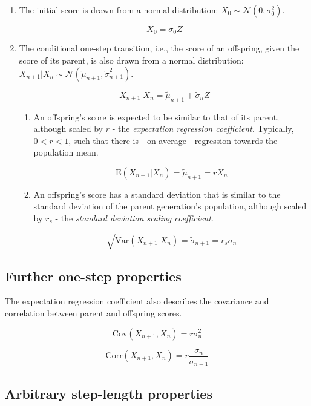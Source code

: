 \documentclass[a4paper,11pt]{article}
\begin{document}
\begin{enumerate}

\item The initial score is drawn from a normal distribution: $X_0 \sim \mathcal{N}(0, \sigma_0^2)$.

$$X_0 = \sigma_0 Z$$

\item The conditional one-step transition, i.e., the score of an offspring, given the score of its parent, is also drawn from a normal distribution: $X_{n+1}|X_n \sim \mathcal{N}(\tilde{\mu}_{n+1}, \tilde{\sigma}_{n+1}^2)$.

$$X_{n+1}|X_n = \tilde{\mu}_{n+1} + \tilde{\sigma}_n Z$$

\begin{enumerate}

\item An offspring's score is expected to be similar to that of its parent, although scaled by $r$ - the \emph{expectation regression coefficient}. Typically, $0 < r < 1$, such that there is - on average - regression towards the population mean.

$$\mathrm{E}(X_{n+1}|X_n) = \tilde{\mu}_{n+1} = rX_n$$

\item An offspring's score has a standard deviation that is similar to the standard deviation of the parent generation's population, although scaled by  $r_s$ - the \emph{standard deviation scaling coefficient}.

$$\sqrt{\mathrm{Var}(X_{n+1}|X_n)} =\tilde{\sigma}_{n+1} = r_s \sigma_n$$

\end{enumerate}
\end{enumerate}


\subsection{Further one-step properties}

The expectation regression coefficient also describes the covariance and correlation between parent and offspring scores. 

$$\mathrm{Cov}(X_{n+1}, X_n) = r \sigma_n^2$$

$$\mathrm{Corr}(X_{n+1}, X_n) = r \frac{\sigma_n}{\sigma_{n+1}}$$


\subsection{Arbitrary step-length properties}
\end{document}
